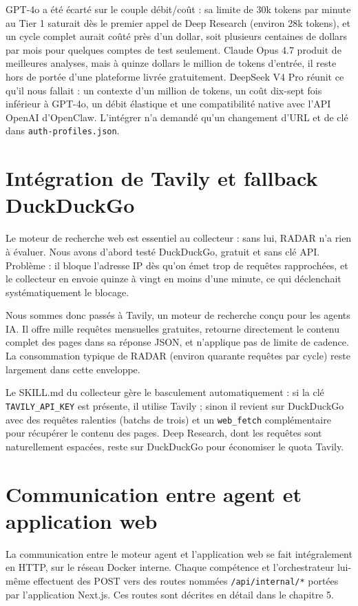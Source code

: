 \documentclass[12pt,a4paper,openany]{report}
\begin{document}
GPT-4o a été écarté sur le couple débit/coût : sa limite de 30k tokens par minute au Tier 1 saturait dès le premier appel de Deep Research (environ 28k tokens), et un cycle complet aurait coûté près d'un dollar, soit plusieurs centaines de dollars par mois pour quelques comptes de test seulement. Claude Opus 4.7 produit de meilleures analyses, mais à quinze dollars le million de tokens d'entrée, il reste hors de portée d'une plateforme livrée gratuitement. DeepSeek V4 Pro réunit ce qu'il nous fallait : un contexte d'un million de tokens, un coût dix-sept fois inférieur à GPT-4o, un débit élastique et une compatibilité native avec l'API OpenAI d'OpenClaw. L'intégrer n'a demandé qu'un changement d'URL et de clé dans \texttt{auth-profiles.json}.

\section{Intégration de Tavily et fallback DuckDuckGo}
\label{sec:integration-tavily}

Le moteur de recherche web est essentiel au collecteur : sans lui, RADAR n'a rien à évaluer. Nous avons d'abord testé DuckDuckGo, gratuit et sans clé API. Problème : il bloque l'adresse IP dès qu'on émet trop de requêtes rapprochées, et le collecteur en envoie quinze à vingt en moins d'une minute, ce qui déclenchait systématiquement le blocage.

Nous sommes donc passés à Tavily, un moteur de recherche conçu pour les agents IA. Il offre mille requêtes mensuelles gratuites, retourne directement le contenu complet des pages dans sa réponse JSON, et n'applique pas de limite de cadence. La consommation typique de RADAR (environ quarante requêtes par cycle) reste largement dans cette enveloppe.

Le SKILL.md du collecteur gère le basculement automatiquement : si la clé \texttt{TAVILY\_API\_KEY} est présente, il utilise Tavily ; sinon il revient sur DuckDuckGo avec des requêtes ralenties (batchs de trois) et un \texttt{web\_fetch} complémentaire pour récupérer le contenu des pages. Deep Research, dont les requêtes sont naturellement espacées, reste sur DuckDuckGo pour économiser le quota Tavily.

\section{Communication entre agent et application web}
\label{sec:communication-agent-web}

La communication entre le moteur agent et l'application web se fait intégralement en HTTP, sur le réseau Docker interne. Chaque compétence et l'orchestrateur lui-même effectuent des POST vers des routes nommées \texttt{/api/internal/*} portées par l'application Next.js. Ces routes sont décrites en détail dans le chapitre 5.
\end{document}
